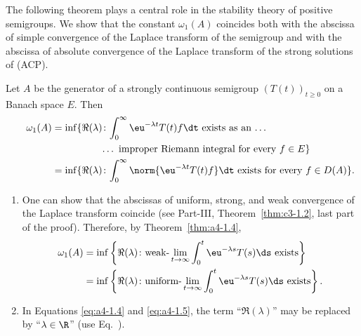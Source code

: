 The following theorem plays a central role in the stability theory of positive semigroups.
We show that the constant $\omega_{1}(A)$ coincides both with the abscissa of simple convergence of the Laplace transform of the semigroup and with the abscissa of absolute convergence of the Laplace transform of the strong solutions of (ACP).
\begin{theorem}\label{thm:a4-1.4}
Let $A$ be the generator of a strongly continuous semigroup $ (T(t))_{t \geq 0} $ on a Banach space $E$. 
Then
\begin{equation}\label{eq:a4-1.4}
\begin{split}
\omega_{1}(A) = \inf\{\Re(\lambda) &\colon {\int_{0}^{\infty} \eu^{-\lambda t} T(t)f  \dt} \text{\ exists as an\  \ldots }\\
	\phantom{\inf\{\Re(\lambda) \colon exists as an} &\text{\ldots\  improper Riemann integral for every } f \in E\} \\
= \inf\{\Re(\lambda) &\colon {\int_{0}^{\infty} \norm{\eu^{-\lambda t} T(t)f}  \dt} \text{ exists for every } f \in D(A)\}.  
\end{split}
\end{equation}
\end{theorem}
\begin{remarks*}\label{rem:a4-1.4}%

\begin{enumerate}[\upshape (i), wide, labelindent=.25em]

\item 
One can show that the abscissas of uniform, strong, and weak convergence of the Laplace transform coincide (see Part-III, Theorem~\ref{thm:c3-1.2}, last part of the proof). 
Therefore, by Theorem~\ref{thm:a4-1.4},
\begin{equation}\label{eq:a4-1.5}
\begin{split}
\omega_1(A) &= \inf \left\{ \Re(\lambda)\colon\text{weak-} \lim_{t \to \infty} {\int_0^t \eu^{-\lambda s} T(s)  \ds} \text{ exists} \right\} \\
    &= \inf \left\{ \Re(\lambda)\colon\text{uniform-} \lim_{t \to \infty} {\int_0^t \eu^{-\lambda s} T(s)  \ds} \text{ exists} \right\} .
\end{split}
\end{equation}
\item
In Equations \eqref{eq:a4-1.4} and \eqref{eq:a4-1.5}, the term \enquote{$\Re(\lambda)$} may be replaced by \enquote{$\lambda \in \R$} (use Eq.~).
\end{enumerate}

\end{remarks*}
